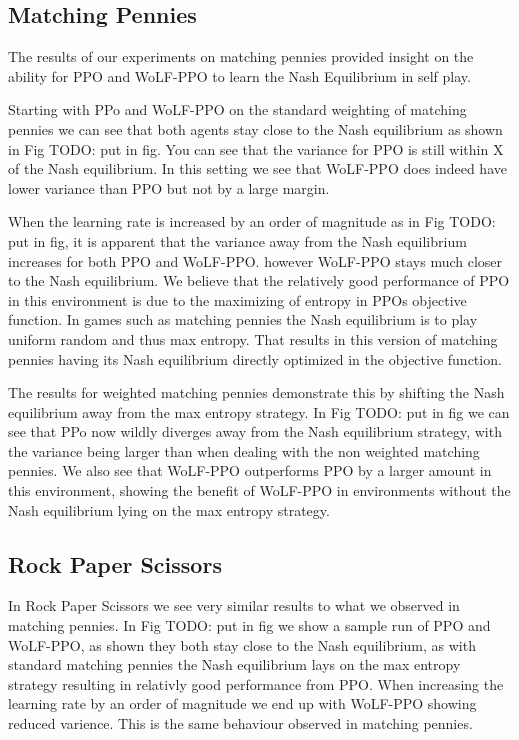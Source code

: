 \documentclass{article}
\newcommand\TODO[1]{{\color{red}TODO: #1}}
\begin{document}
\subsection{Matching Pennies}

The results of our experiments on matching pennies provided insight on the ability for PPO and WoLF-PPO to learn the Nash Equilibrium in self play.

Starting with PPo and WoLF-PPO on the standard weighting of matching pennies we can see that both agents stay close to the Nash equilibrium as shown in Fig \TODO{put in fig}. You can see that the variance for PPO is still within X of the Nash equilibrium. In this setting we see that WoLF-PPO does indeed have lower variance than PPO but not by a large margin.

When the learning rate is increased by an order of magnitude as in Fig \TODO{put in fig}, it is apparent that the variance away from the Nash equilibrium increases for both PPO and WoLF-PPO. however WoLF-PPO stays much closer to the Nash equilibrium. We believe that the relatively good performance of PPO in this environment is due to the maximizing of entropy in PPOs objective function. In games such as matching pennies the Nash equilibrium is to play uniform random and thus max entropy. That results in this version of matching pennies having its Nash equilibrium directly optimized in the objective function.

The results for weighted matching pennies demonstrate this by shifting the Nash equilibrium away from the max entropy strategy. In Fig \TODO{put in fig} we can see that PPo now wildly diverges away from the Nash equilibrium strategy, with the variance being larger than when dealing with the non weighted matching pennies. We also see that WoLF-PPO outperforms PPO by a larger amount in this environment, showing the benefit of WoLF-PPO in environments without the Nash equilibrium lying on the max entropy strategy.

\subsection{Rock Paper Scissors}

In Rock Paper Scissors we see very similar results to what we observed in matching pennies. In Fig \TODO{put in fig} we show a sample run of PPO and WoLF-PPO, as shown they both stay close to the Nash equilibrium, as with standard matching pennies the Nash equilibrium lays on the max entropy strategy resulting in relativly good performance from PPO. When increasing the learning rate by an order of magnitude we end up with WoLF-PPO showing reduced varience. This is the same behaviour observed in matching pennies.
\end{document}
